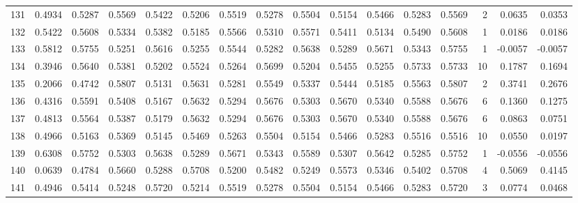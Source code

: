 \begin{tabular}{lrrrrrrrrrrrrrrr}
131 &      0.4934 &  0.5287 &  0.5569 &  0.5422 &  0.5206 &  0.5519 &  0.5278 &  0.5504 &  0.5154 &  0.5466 &   0.5283 &     0.5569 &      2 &                    0.0635 &                     0.0353 \\
132 &      0.5422 &  0.5608 &  0.5334 &  0.5382 &  0.5185 &  0.5566 &  0.5310 &  0.5571 &  0.5411 &  0.5134 &   0.5490 &     0.5608 &      1 &                    0.0186 &                     0.0186 \\
133 &      0.5812 &  0.5755 &  0.5251 &  0.5616 &  0.5255 &  0.5544 &  0.5282 &  0.5638 &  0.5289 &  0.5671 &   0.5343 &     0.5755 &      1 &                   -0.0057 &                    -0.0057 \\
134 &      0.3946 &  0.5640 &  0.5381 &  0.5202 &  0.5524 &  0.5264 &  0.5699 &  0.5204 &  0.5455 &  0.5255 &   0.5733 &     0.5733 &     10 &                    0.1787 &                     0.1694 \\
135 &      0.2066 &  0.4742 &  0.5807 &  0.5131 &  0.5631 &  0.5281 &  0.5549 &  0.5337 &  0.5444 &  0.5185 &   0.5563 &     0.5807 &      2 &                    0.3741 &                     0.2676 \\
136 &      0.4316 &  0.5591 &  0.5408 &  0.5167 &  0.5632 &  0.5294 &  0.5676 &  0.5303 &  0.5670 &  0.5340 &   0.5588 &     0.5676 &      6 &                    0.1360 &                     0.1275 \\
137 &      0.4813 &  0.5564 &  0.5387 &  0.5179 &  0.5632 &  0.5294 &  0.5676 &  0.5303 &  0.5670 &  0.5340 &   0.5588 &     0.5676 &      6 &                    0.0863 &                     0.0751 \\
138 &      0.4966 &  0.5163 &  0.5369 &  0.5145 &  0.5469 &  0.5263 &  0.5504 &  0.5154 &  0.5466 &  0.5283 &   0.5516 &     0.5516 &     10 &                    0.0550 &                     0.0197 \\
139 &      0.6308 &  0.5752 &  0.5303 &  0.5638 &  0.5289 &  0.5671 &  0.5343 &  0.5589 &  0.5307 &  0.5642 &   0.5285 &     0.5752 &      1 &                   -0.0556 &                    -0.0556 \\
140 &      0.0639 &  0.4784 &  0.5660 &  0.5288 &  0.5708 &  0.5200 &  0.5482 &  0.5249 &  0.5573 &  0.5346 &   0.5402 &     0.5708 &      4 &                    0.5069 &                     0.4145 \\
141 &      0.4946 &  0.5414 &  0.5248 &  0.5720 &  0.5214 &  0.5519 &  0.5278 &  0.5504 &  0.5154 &  0.5466 &   0.5283 &     0.5720 &      3 &                    0.0774 &                     0.0468 \\

\end{tabular}
